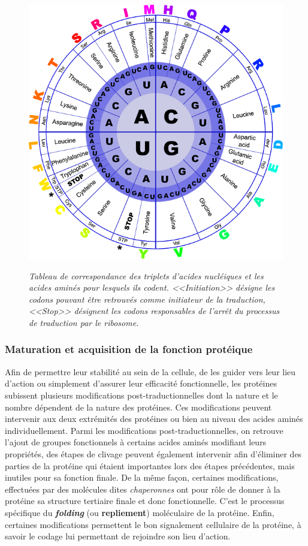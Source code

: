 \begin{figure}
  \centering
  {\includegraphics[width=0.55\linewidth]{./figures/ch1/codon_table_circle}}
    \caption[Tableau de correspondance des triplets d'acides nucléiques et les acides aminés.]{\it Tableau de correspondance des triplets d'acides nucléiques et les acides aminés pour lesquels ils codent. <<Initiation>> désigne les codons pouvant être retrouvés comme initiateur de la traduction, <<Stop>> désignent les codons responsables de l'arrêt du processus de traduction par le ribosome.}
    \label{Fig:codon_table}
  \hspace{0.2cm}
\end{figure}

\subsubsection{Maturation et acquisition de la fonction protéique}

Afin de permettre leur stabilité au sein de la cellule, de les guider vers leur lieu d'action ou simplement d'assurer leur efficacité fonctionnelle, les protéines subissent plusieurs modifications post-traductionnelles dont la nature et le nombre dépendent de la nature des protéines. Ces modifications peuvent intervenir aux deux extrémités des protéines ou bien au niveau des acides aminés individuellement. Parmi les modifications post-traductionnelles, on retrouve l'ajout de groupes fonctionnels à certains acides aminés modifiant leurs propriétés, des étapes de clivage peuvent également intervenir afin d'éliminer des parties de la protéine qui étaient importantes lors des étapes précédentes, mais inutiles pour sa fonction finale. De la même façon, certaines modifications, effectuées par des molécules dites \textit{chaperonnes} ont pour rôle de donner à la protéine sa structure tertiaire finale et donc fonctionnelle. C'est le processus spécifique du \textbf{\textit{folding}} (ou \textbf{repliement}) moléculaire de la protéine. Enfin, certaines modifications permettent le bon signalement cellulaire de la protéine, à savoir le codage lui permettant de rejoindre son lieu d'action.

